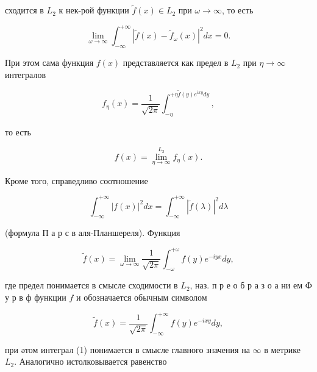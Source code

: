 \documentclass[10pt]{article}
\begin{document}
сходится в $L_{2}$ к нек-рой функции $\tilde{f}(x) \in L_{2}$ при $\omega \rightarrow \infty$, то есть



\[

\lim _{\omega \rightarrow \infty} \int_{-\infty}^{+\infty}\left|\tilde{f}(x)-\tilde{f}_{\omega}(x)\right|^{2} d x=0 .

\]



При этом сама функция $f(x)$ представляется как предел в $L_{2}$ при $\eta \rightarrow \infty$ интегралов



\[

f_{\eta}(x)=\frac{1}{\sqrt{2 \pi}} \int_{-\eta}^{+\eta \tilde{f}(y) e^{i x y} d y},

\]



то есть



\[

f(x)=\lim _{\eta \rightarrow \infty}^{L_{2}} f_{\eta}(x) .

\]



Кроме того, справедливо соотношение



\[

\int_{-\infty}^{+\infty}|f(x)|^{2} d x=\int_{-\infty}^{+\infty}|\tilde{f}(\lambda)|^{2} d \lambda

\]



(формула П а р с в аля-Планшереля). Функция



\[

\tilde{f}(x)=\lim _{\omega \rightarrow \infty} \frac{1}{\sqrt{2 \pi}} \int_{-\omega}^{+\omega} f(y) e^{-i y x} d y,

\]



где предел понимается в смысле сходимости в $L_{2}$, наз. п р е о б р а з о а ни ем Ф у р в ф функции $f$ и обозначается обычным символом



\[

\tilde{f}(x)=\frac{1}{\sqrt{2 \pi}} \int_{-\infty}^{+\infty} f(y) e^{-i x y} d y,

\]



при әтом интеграл (1) понимается в смысле главного значения на $\infty$ в метрике $L_{2}$. Аналогично истолковывается равенство
\end{document}
